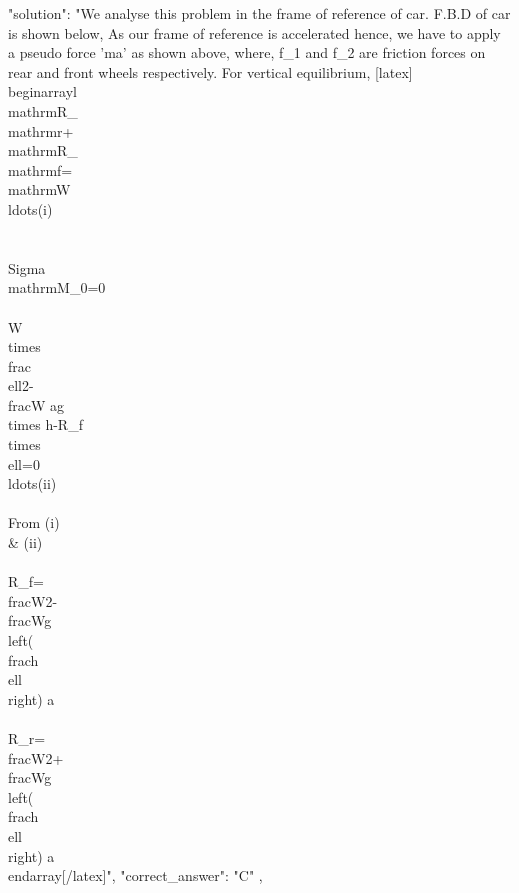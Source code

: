 {    "solution": "We analyse this problem in the frame of reference of car. F.B.D of car is shown below, As our frame of reference is accelerated hence, we have to apply a pseudo force 'ma' as shown above, where, f_{1} and f_{2} are friction forces on rear and front wheels respectively. For vertical equilibrium, [latex]\\begin{array}{l} \\mathrm{R}_{\\mathrm{r}}+\\mathrm{R}_{\\mathrm{f}}=\\mathrm{W} \\ldots(i)\\\\ \\Sigma \\mathrm{M}_{0}=0\\\\ W \\times \\frac{\\ell}{2}-\\frac{W a}{g} \\times h-R_{f} \\times \\ell=0 \\ldots(ii)\\\\ From (i) \\& (ii)\\\\ R_{f}=\\frac{W}{2}-\\frac{W}{g}\\left(\\frac{h}{\\ell}\\right) a \\\\ R_{r}=\\frac{W}{2}+\\frac{W}{g}\\left(\\frac{h}{\\ell}\\right) a \\end{array}[/latex]",
    "correct_answer": "C"
  },
